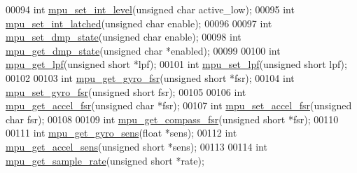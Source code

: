 \begin{DoxyCode}
00094 \textcolor{keywordtype}{int} \hyperlink{group___d_r_i_v_e_r_s_gacc92fb1489ef32a04bcb6b0ebde4d657}{mpu\_set\_int\_level}(\textcolor{keywordtype}{unsigned} \textcolor{keywordtype}{char} active\_low);
00095 \textcolor{keywordtype}{int} \hyperlink{group___d_r_i_v_e_r_s_ga653cb855300bff9285ce4b8dca6a503b}{mpu\_set\_int\_latched}(\textcolor{keywordtype}{unsigned} \textcolor{keywordtype}{char} enable);
00096 
00097 \textcolor{keywordtype}{int} \hyperlink{group___d_r_i_v_e_r_s_ga68ed20e6c9663cd7c50469329af8715f}{mpu\_set\_dmp\_state}(\textcolor{keywordtype}{unsigned} \textcolor{keywordtype}{char} enable);
00098 \textcolor{keywordtype}{int} \hyperlink{group___d_r_i_v_e_r_s_gafe0f60ed0d7f8fd2dcd55d45b95a2363}{mpu\_get\_dmp\_state}(\textcolor{keywordtype}{unsigned} \textcolor{keywordtype}{char} *enabled);
00099 
00100 \textcolor{keywordtype}{int} \hyperlink{group___d_r_i_v_e_r_s_gaa95c7e216dcb2d888e9796001ca555f8}{mpu\_get\_lpf}(\textcolor{keywordtype}{unsigned} \textcolor{keywordtype}{short} *lpf);
00101 \textcolor{keywordtype}{int} \hyperlink{group___d_r_i_v_e_r_s_ga5661a9dee25152166769910767a2a93d}{mpu\_set\_lpf}(\textcolor{keywordtype}{unsigned} \textcolor{keywordtype}{short} lpf);
00102 
00103 \textcolor{keywordtype}{int} \hyperlink{group___d_r_i_v_e_r_s_gaf973c32c73ba912ff512aab948fc31ca}{mpu\_get\_gyro\_fsr}(\textcolor{keywordtype}{unsigned} \textcolor{keywordtype}{short} *fsr);
00104 \textcolor{keywordtype}{int} \hyperlink{group___d_r_i_v_e_r_s_gad09e6031c8677adc0b8a39b6deea8e27}{mpu\_set\_gyro\_fsr}(\textcolor{keywordtype}{unsigned} \textcolor{keywordtype}{short} fsr);
00105 
00106 \textcolor{keywordtype}{int} \hyperlink{group___d_r_i_v_e_r_s_gab6087a15ee23db23b6aec41590329a60}{mpu\_get\_accel\_fsr}(\textcolor{keywordtype}{unsigned} \textcolor{keywordtype}{char} *fsr);
00107 \textcolor{keywordtype}{int} \hyperlink{group___d_r_i_v_e_r_s_ga2713a96af104cfb2ae8e0ed4c3718119}{mpu\_set\_accel\_fsr}(\textcolor{keywordtype}{unsigned} \textcolor{keywordtype}{char} fsr);
00108 
00109 \textcolor{keywordtype}{int} \hyperlink{group___d_r_i_v_e_r_s_gade8589573d09e0f14b84130428f286df}{mpu\_get\_compass\_fsr}(\textcolor{keywordtype}{unsigned} \textcolor{keywordtype}{short} *fsr);
00110 
00111 \textcolor{keywordtype}{int} \hyperlink{group___d_r_i_v_e_r_s_ga023c0cc94aa8f162dc33b15048a49421}{mpu\_get\_gyro\_sens}(\textcolor{keywordtype}{float} *sens);
00112 \textcolor{keywordtype}{int} \hyperlink{group___d_r_i_v_e_r_s_ga620408949052b96e856cad920f856583}{mpu\_get\_accel\_sens}(\textcolor{keywordtype}{unsigned} \textcolor{keywordtype}{short} *sens);
00113 
00114 \textcolor{keywordtype}{int} \hyperlink{group___d_r_i_v_e_r_s_ga2487dd551b701c1c7ed4d6335f02b2f1}{mpu\_get\_sample\_rate}(\textcolor{keywordtype}{unsigned} \textcolor{keywordtype}{short} *rate);

\end{DoxyCode}
